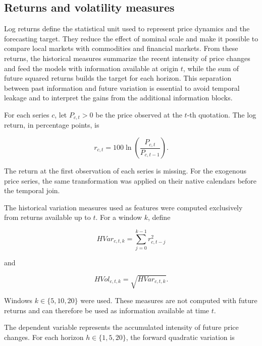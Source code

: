 \documentclass[a4paper,fleqn]{cas-sc}
\begin{document}
\subsection{Returns and volatility measures}
\label{subsec:returns_volatility}

Log returns define the statistical unit used to represent price dynamics and the forecasting target. They reduce the effect of nominal scale and make it possible to compare local markets with commodities and financial markets. From these returns, the historical measures summarize the recent intensity of price changes and feed the models with information available at origin \(t\), while the sum of future squared returns builds the target for each horizon. This separation between past information and future variation is essential to avoid temporal leakage and to interpret the gains from the additional information blocks.

For each series \(c\), let \(P_{c,t}>0\) be the price observed at the \(t\)-th quotation. The log return, in percentage points, is

\begin{equation}
r_{c,t}=100\ln\left(\frac{P_{c,t}}{P_{c,t-1}}\right).
\label{eq:log_return}
\end{equation}

The return at the first observation of each series is missing. For the exogenous price series, the same transformation was applied on their native calendars before the temporal join.

The historical variation measures used as features were computed exclusively from returns available up to \(t\). For a window \(k\), define

\begin{equation}
HVar_{c,t,k}=\sum_{j=0}^{k-1}r_{c,t-j}^{2}
\label{eq:hist_var}
\end{equation}

and

\begin{equation}
HVol_{c,t,k}=\sqrt{HVar_{c,t,k}}.
\label{eq:hist_vol}
\end{equation}

Windows \(k\in\{5,10,20\}\) were used. These measures are not computed with future returns and can therefore be used as information available at time \(t\).

The dependent variable represents the accumulated intensity of future price changes. For each horizon \(h\in\{1,5,20\}\), the forward quadratic variation is
\end{document}
